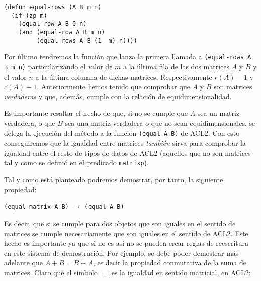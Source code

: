 \documentclass[a4paper,10pt]{article}
\begin{document}
\par \vspace{10pt}		

\begin{lstlisting}[language=clips]
(defun equal-rows (A B m n)
  (if (zp m)
    (equal-row A B 0 n)
    (and (equal-row A B m n)
         (equal-rows A B (1- m) n))))
\end{lstlisting}

\par \vspace{10pt}		

Por último tendremos la función que lanza la primera llamada a \texttt{(equal-rows A B m n)} particularizando el valor de $m$ a la última fila de las dos matrices $A$ y $B$ y el valor $n$ a la última columna de dichas matrices. Respectivamente $r(A) - 1$ y $c(A) - 1$. Anteriormente hemos tenido que comprobar que $A$ y $B$ son matrices \emph{verdaderas} y que, además, cumple con la relación de equidimensionalidad. 

\par \vspace{10pt}		

Es importante resaltar el hecho de que, si no se cumple que $A$ sea un matriz verdadera, o que $B$ sea una matriz verdadera o que no sean equidimensionales, se delega la ejecución del método a la función \texttt{(equal A B)} de ACL2. Con esto conseguiremos que la igualdad entre matrices \emph{también} sirva para comprobar la igualdad entre el resto de tipos de datos de ACL2 (aquellos que no son matrices tal y como se definió en el predicado \texttt{matrixp}). 

\par \vspace{10pt}		

Tal y como está planteado podremos demostrar, por tanto, la siguiente propiedad:

\par \vspace{10pt}		

\begin{center}
\texttt{(equal-matrix A B)} $\longrightarrow$ \texttt{(equal A B)}
\end{center}

\par \vspace{10pt}		

Es decir, que si se cumple para dos objetos que son iguales en el sentido de matrices se cumple necesariamente que son iguales en el sentido de ACL2. Este hecho es importante ya que si no es así no se pueden crear reglas de reescritura en este sistema de demostración. Por ejemplo, se debe poder demostrar más adelante que $A+B=B+A$, es decir la propiedad conmutativa de la suma de matrices. Claro que el símbolo $=$ es la igualdad en sentido matricial, en ACL2:
\end{document}
